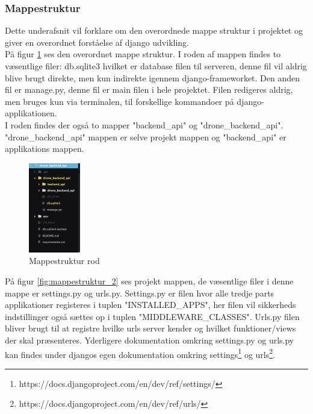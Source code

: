 \subsubsection*{Mappestruktur}
Dette underafsnit vil forklare om den overordnede mappe struktur i projektet og giver en overordnet forståelse af django udvikling. \\

På figur \ref{fig:mappestruktur_1} ses den overordnet mappe struktur. I roden af mappen findes to væsentlige filer: db.sqlite3 hvilket er database filen til serveren, denne fil vil aldrig blive brugt direkte, men kun indirekte igennem django-frameworket. Den anden fil er manage.py, denne fil er main filen i hele projektet. Filen redigeres aldrig, men bruges kun via terminalen, til forskellige kommandoer på django-applikationen. \\

I roden findes der også to mapper "backend\_api" og "drone\_backend\_api". "drone\_backend\_api"  mappen er selve projekt mappen og "backend\_api" er applikations mappen.

\begin{figure}[H]
	\centering
	\includegraphics[width=0.2\textwidth]{Billeder/implementation/mappestruktur_1.png}
	\caption{Mappestruktur rod}
	\label{fig:mappestruktur_1}
\end{figure}

På figur \ref{fig:mappestruktur_2} ses projekt mappen, de væsentlige filer i denne mappe er settings.py og urls.py. Settings.py er filen hvor alle tredje parts applikationer registeres i tuplen "INSTALLED\_APPS", her filen vil sikkerheds indstillinger også sættes op i tuplen "MIDDLEWARE\_CLASSES". Urls.py filen bliver brugt til at registre hvilke urls server kender og hvilket funktioner/views der skal præsenteres. Yderligere dokumentation omkring settings.py og urls.py kan findes under djangos egen dokumentation omkring settings\footnote{https://docs.djangoproject.com/en/dev/ref/settings/} og urls\footnote{https://docs.djangoproject.com/en/dev/ref/urls/}.

